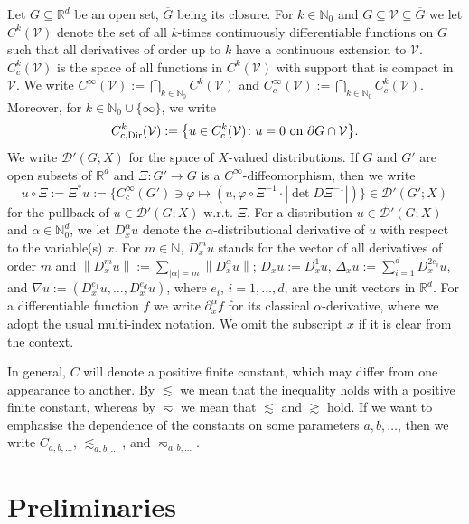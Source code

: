 \documentclass[12pt,a4paper, reqno]{amsart}
\theoremstyle{plain}
\theoremstyle{definition}
\theoremstyle{remark}
\numberwithin{equation}{section}
\newcommand{\1}{\mathbbm{1}}
\newcommand{\R}{\ensuremath{\mathbb{R}}}
\newcommand{\N}{\ensuremath{\mathbb{N}}}
\newcommand{\calV}{\ensuremath{\mathcal{V}}}
\newcommand{\scrD}{\ensuremath{\mathscr{D}}}
\newcommand{\Dir}{\textup{Dir}}
\newcommand{\nrm}[1]{\left\lVert #1 \right\rVert}
\begin{document}
Let $G\subseteq\R^d$ be an open set, $\overline{G}$ being its closure. 
 For $k\in\N_0$ and $G\subseteq\calV\subseteq\overline{G}$ we let $C^k(\calV)$ denote the set of all $k$-times continuously differentiable functions on $G$ such that all derivatives of order up to $k$ have a continuous extension to $\calV$.
$C_c^k(\calV)$ is the space of all functions in $C^k(\calV)$ with support that is compact in $\calV$.
We write $C^\infty(\calV):=\bigcap_{k\in\N_0}C^k(\calV)$ and $C_c^\infty(\calV):=\bigcap_{k\in\N_0}C_c^k(\calV)$.
Moreover, for $k\in \N_0\cup\{\infty\}$, we write 
\[
C_{c,\Dir}^k(\calV)
:= 
\big\{u\in C_c^k(\calV)\colon u=0 \text{ on } \partial G\cap \calV \big\}.
\]
We write $ \scrD'(G;X)$ for the space of $X$-valued distributions.
If $G$ and $G'$ are open subsets of $\R^d$ and $\Xi:G'\rightarrow G$ is a $C^\infty$-diffeomorphism, then we write
\[
u\circ \Xi := \Xi^*u:=\bigl\{C_c^\infty(G')\ni \varphi \mapsto (u,\varphi\circ\Xi^{-1}\cdot |\det D\Xi^{-1}|)\bigr\} \in \scrD'(G';X)
\]
 for the pullback of $u\in \scrD'(G;X)$ w.r.t. $\Xi$. 
For a distribution $u\in \scrD'(G;X) $ and $\alpha\in \N_0^d$, we let $ D^\alpha_x u $ denote the $\alpha$-distributional derivative of $u$ with respect to the variable(s) $x$. 
For $m\in\N$, $D^m_x u$ stands for the vector of all derivatives of order $m$ and $\nrm{D^m_x u}:=\sum_{\lvert\alpha\rvert=m}\nrm{D^\alpha_x u}$; $D_xu:=D_x^1u$, $\Delta_xu:=\sum_{i=1}^d D^{2e_i}_xu$, and $\nabla u:= (D^{e_1}_xu,\ldots,D^{e_d}_xu)$, where $e_i$, $i=1,\ldots,d$, are the unit vectors in $\R^d$.
For a differentiable function $f$ we write $ \partial^\alpha_x f $ for its classical $\alpha$-derivative, where we adopt the usual multi-index notation.
We omit the subscript $x$ if it is clear from the context. 

In general, $C$ will denote a positive finite constant, which may differ 
from one appearance to another. 
By $\lesssim$ we mean that the inequality holds with a positive finite constant, whereas by $\eqsim$ we mean that $\lesssim$ and $\gtrsim$ hold.
If we want to emphasise the dependence of the constants on some parameters $a,b,\ldots$, then we write $C_{a,b,\ldots}$, $\lesssim_{a,b,\ldots}$, and $\eqsim_{a,b,\ldots}$.

\section{Preliminaries}\label{sec:prelim}
\end{document}
